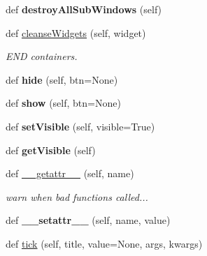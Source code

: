 \begin{DoxyCompactItemize}
def {\bfseries destroy\+All\+Sub\+Windows} (self)
\item 
\mbox{\label{class_python_01_g_u_i_1_1appjar_1_1gui_aa751a75c7035373fabac194cfb98cfc8}} 
def \hyperlink{class_python_01_g_u_i_1_1appjar_1_1gui_aa751a75c7035373fabac194cfb98cfc8}{cleanse\+Widgets} (self, widget)
\begin{DoxyCompactList}\small\item\em E\+ND containers. \end{DoxyCompactList}\item 
\mbox{\label{class_python_01_g_u_i_1_1appjar_1_1gui_a755619ffe1612e25cfcaee814fb27e9a}} 
def {\bfseries hide} (self, btn=None)
\item 
\mbox{\label{class_python_01_g_u_i_1_1appjar_1_1gui_a9d9d885d88fba6f4307772735c225275}} 
def {\bfseries show} (self, btn=None)
\item 
\mbox{\label{class_python_01_g_u_i_1_1appjar_1_1gui_af00640db9617a5b515f60230eb8463eb}} 
def {\bfseries set\+Visible} (self, visible=True)
\item 
\mbox{\label{class_python_01_g_u_i_1_1appjar_1_1gui_ae2d7c019db5757ebfb2b7f7d907c4484}} 
def {\bfseries get\+Visible} (self)
\item 
\mbox{\label{class_python_01_g_u_i_1_1appjar_1_1gui_aa11ac127968d721cd292465279c4c98f}} 
def \hyperlink{class_python_01_g_u_i_1_1appjar_1_1gui_aa11ac127968d721cd292465279c4c98f}{\+\_\+\+\_\+getattr\+\_\+\+\_\+} (self, name)
\begin{DoxyCompactList}\small\item\em warn when bad functions called... \end{DoxyCompactList}\item 
\mbox{\label{class_python_01_g_u_i_1_1appjar_1_1gui_adcc86d2fd6bde54171722cccd551fcb7}} 
def {\bfseries \+\_\+\+\_\+setattr\+\_\+\+\_\+} (self, name, value)
\item 
def \hyperlink{class_python_01_g_u_i_1_1appjar_1_1gui_a7e3bbb08ee85d2e8d1acc4757f18ede4}{tick} (self, title, value=None, args, kwargs)

\end{DoxyCompactItemize}
